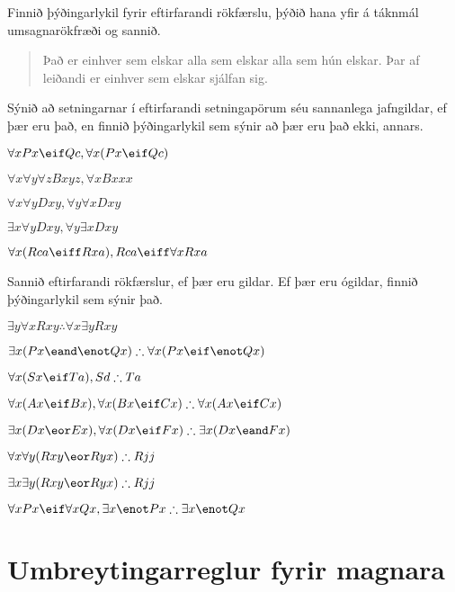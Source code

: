 \problempart
\label{pr.likes}
Finnið þýðingarlykil fyrir eftirfarandi rökfærslu, þýðið hana yfir á táknmál umsagnarökfræði og sannið.
\begin{quote}
Það er einhver sem elskar alla sem elskar alla sem hún elskar.	Þar af leiðandi er einhver sem elskar sjálfan sig.
\end{quote}

\problempart
\label{pr.FOLequivornot}
Sýnið að setningarnar í eftirfarandi setningapörum séu sannanlega jafngildar, ef þær eru það, en finnið þýðingarlykil sem sýnir að þær eru það ekki, annars.
\begin{earg}
\item $\forall x Px \eif Qc, \forall x (Px \eif Qc)$
\item $\forall x\forall y \forall z Bxyz, \forall x Bxxx$
\item $\forall x\forall y Dxy, \forall y\forall x Dxy$
\item $\exists x\forall y Dxy, \forall y\exists x Dxy$
\item $\forall x (Rca \eiff Rxa), Rca \eiff \forall x Rxa$
\end{earg}

\problempart
\label{pr.FOLvalidornot}
Sannið eftirfarandi rökfærslur, ef þær eru gildar. Ef þær eru ógildar, finnið þýðingarlykil sem sýnir það.
\begin{earg}
\item $\exists y\forall x Rxy \therefore \forall x\exists y Rxy$
\item $\exists x(Px \eand \enot Qx) \therefore \forall x(Px \eif \enot Qx)$
\item $\forall x(Sx \eif Ta), Sd \therefore Ta$
\item $\forall x(Ax\eif Bx), \forall x(Bx \eif Cx) \therefore \forall x(Ax \eif Cx)$
\item $\exists x(Dx \eor Ex), \forall x(Dx \eif Fx) \therefore \exists x(Dx \eand Fx)$
\item $\forall x\forall y(Rxy \eor Ryx) \therefore Rjj$
\item $\exists x\exists y(Rxy \eor Ryx) \therefore Rjj$
\item $\forall x Px \eif \forall x Qx, \exists x \enot Px \therefore \exists x \enot Qx$
\end{earg}


\chapter{Umbreytingarreglur fyrir magnara}\label{s:CQ}

